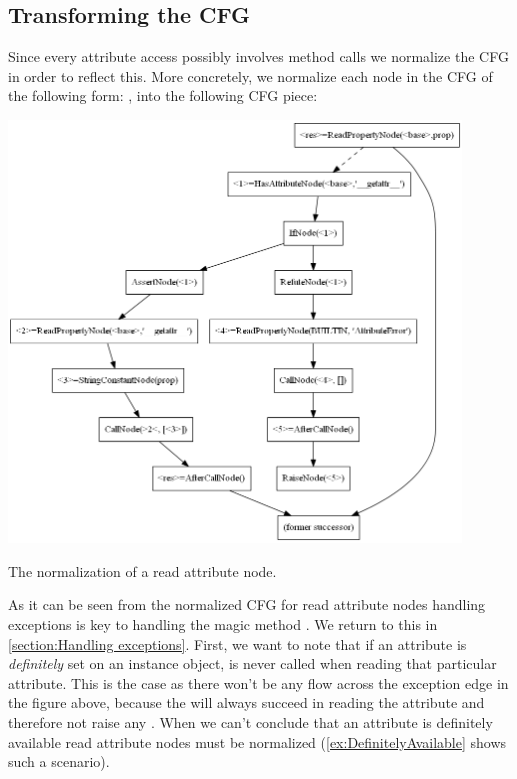 \subsection{Transforming the CFG}
\label{Magic methods transformation}
Since every attribute access possibly involves method calls we normalize the CFG in order to reflect this. More concretely, we normalize each node in the CFG of the following form: , into the following CFG piece:

\begin{listing}[H]
  \begin{center}
    \includegraphics[width=0.9\textwidth]{images/readproperty.png}
  \end{center}
  \vspace{-10pt}
  \caption{The normalization of a read attribute node.}
  \label{fig:MagicMethods1}
\end{listing}

As it can be seen from the normalized CFG for read attribute nodes handling exceptions is key to handling the magic method . We return to this in \autoref{section:Handling exceptions}. First, we want to note that if an attribute is \textit{definitely} set on an instance object,  is never called when reading that particular attribute. This is the case as there won't be any flow across the exception edge in the figure above, because the  will always succeed in reading the attribute and therefore not raise any . When we can't conclude that an attribute is definitely available read attribute nodes must be normalized (\autoref{ex:DefinitelyAvailable} shows such a scenario).

